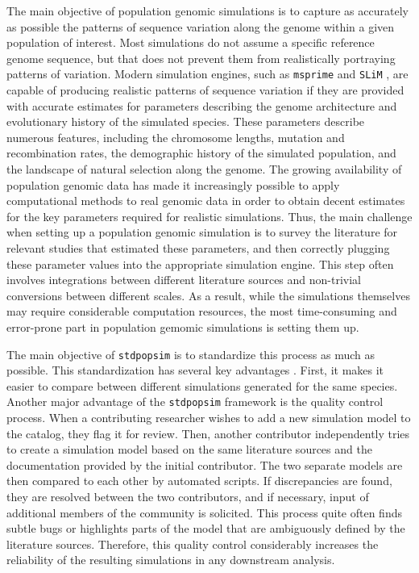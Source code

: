 \documentclass[hidelinks]{article}
\begin{document}
	
The main objective of population genomic simulations is to capture as accurately as possible the patterns of sequence variation along the genome within a given population of interest. Most simulations do not assume a specific reference genome sequence, but that does not prevent them from realistically portraying patterns of variation. Modern simulation engines, such as \texttt{msprime} \citep{Kelleher2016,Nelson2020} and \texttt{SLiM} \citep{Haller2019}, are capable of producing realistic patterns of sequence variation if they are provided with accurate estimates for parameters describing the genome architecture and evolutionary history of the simulated species. These parameters describe numerous features, including the chromosome lengths,  mutation and recombination rates, the demographic history of the simulated population, and the landscape of natural selection along the genome. The growing availability of population genomic data has made it increasingly possible to apply computational methods to real genomic data in order to obtain decent estimates for the key parameters required for realistic simulations. Thus, the main challenge when setting up a population genomic simulation is to survey the literature for relevant studies that estimated these parameters, and then correctly plugging these parameter values into the appropriate simulation engine. This step often involves integrations between different literature sources and non-trivial conversions between different scales. As a result, while the simulations themselves may require considerable computation resources, the most time-consuming and error-prone part in population gemomic simulations is setting them up.


The main objective of \texttt{stdpopsim} is to standardize this process as much as possible.
This standardization has several key advantages \citep{Adrion2020}. First, it makes it easier to compare between different
simulations generated for the same species. Another major advantage of the
\texttt{stdpopsim} framework is the quality control process.
When a contributing researcher wishes to add a new simulation model to the catalog,
they flag it for review. Then, another contributor independently tries to create a simulation model based on the same literature sources and the documentation provided by the initial contributor. The two separate models are then
compared to each other by automated scripts. If discrepancies are found, they
are resolved between the two contributors, and if necessary, input of additional members of the community is solicited. This process quite often
finds subtle bugs  \citep{Ragsdale2020} or highlights parts of the model that are
ambiguously defined by the literature sources. 
Therefore, this quality control considerably increases the reliability of the
resulting simulations in any downstream analysis.
\end{document}
